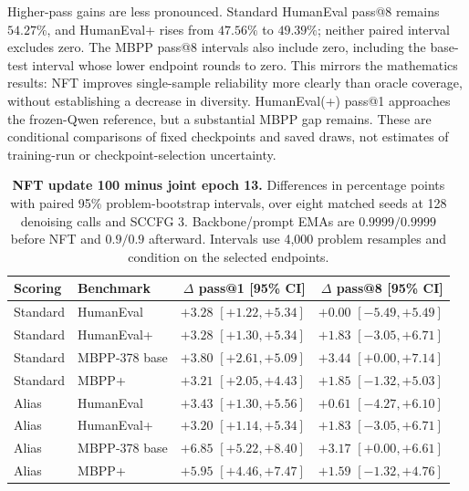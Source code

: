 \documentclass{article}
\begin{document}
Higher-pass gains are less pronounced. Standard HumanEval pass@8 remains $54.27\%$, and HumanEval+ rises from $47.56\%$ to $49.39\%$; neither paired interval excludes zero. The MBPP pass@8 intervals also include zero, including the base-test interval whose lower endpoint rounds to zero. This mirrors the mathematics results: NFT improves single-sample reliability more clearly than oracle coverage, without establishing a decrease in diversity. HumanEval(+) pass@1 approaches the frozen-Qwen reference, but a substantial MBPP gap remains. These are conditional comparisons of fixed checkpoints and saved draws, not estimates of training-run or checkpoint-selection uncertainty.

\begin{table}[htbp]
\centering\small
\setlength{\tabcolsep}{4pt}
\caption{\textbf{NFT update 100 minus joint epoch 13.} Differences in percentage points with paired 95\% problem-bootstrap intervals, over eight matched seeds at 128 denoising calls and SCCFG 3. Backbone/prompt EMAs are $0.9999/0.9999$ before NFT and $0.9/0.9$ afterward. Intervals use 4,000 problem resamples and condition on the selected endpoints.}
\label{tab:codingnftdeltas}
\begin{tabular}{@{}llrr@{}}
\toprule
Scoring & Benchmark & $\Delta$ pass@1 [95\% CI] & $\Delta$ pass@8 [95\% CI]\\
\midrule
Standard & HumanEval & $+3.28$ {\scriptsize $[+1.22,+5.34]$} & $+0.00$ {\scriptsize $[-5.49,+5.49]$}\\
Standard & HumanEval+ & $+3.28$ {\scriptsize $[+1.30,+5.34]$} & $+1.83$ {\scriptsize $[-3.05,+6.71]$}\\
Standard & MBPP-378 base & $+3.80$ {\scriptsize $[+2.61,+5.09]$} & $+3.44$ {\scriptsize $[+0.00,+7.14]$}\\
Standard & MBPP+ & $+3.21$ {\scriptsize $[+2.05,+4.43]$} & $+1.85$ {\scriptsize $[-1.32,+5.03]$}\\
\midrule
Alias & HumanEval & $+3.43$ {\scriptsize $[+1.30,+5.56]$} & $+0.61$ {\scriptsize $[-4.27,+6.10]$}\\
Alias & HumanEval+ & $+3.20$ {\scriptsize $[+1.14,+5.34]$} & $+1.83$ {\scriptsize $[-3.05,+6.71]$}\\
Alias & MBPP-378 base & $+6.85$ {\scriptsize $[+5.22,+8.40]$} & $+3.17$ {\scriptsize $[+0.00,+6.61]$}\\
Alias & MBPP+ & $+5.95$ {\scriptsize $[+4.46,+7.47]$} & $+1.59$ {\scriptsize $[-1.32,+4.76]$}\\
\bottomrule
\end{tabular}
\end{table}
\end{document}
